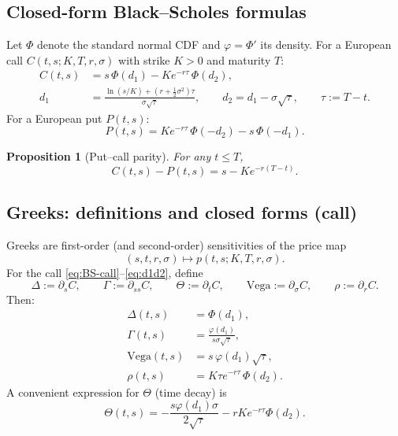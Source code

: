 \documentclass[11pt]{article}
\newcommand{\1}{\mathbf{1}}
\theoremstyle{plain}
\newtheorem{proposition}[theorem]{Proposition}
\theoremstyle{definition}
\theoremstyle{remark}
\begin{document}
\subsection{Closed-form Black--Scholes formulas}
Let $\Phi$ denote the standard normal CDF and $\varphi=\Phi'$ its density.
For a European call $C(t,s;K,T,r,\sigma)$ with strike $K>0$ and maturity $T$:
\begin{align}
C(t,s) &= s\,\Phi(d_1)-K e^{-r\tau}\,\Phi(d_2), \label{eq:BS-call}\\
d_1 &= \frac{\ln(s/K)+(r+\tfrac12\sigma^2)\tau}{\sigma\sqrt{\tau}},\qquad
d_2 = d_1-\sigma\sqrt{\tau},\qquad \tau:=T-t. \label{eq:d1d2}
\end{align}
For a European put $P(t,s)$:
\begin{equation}\label{eq:BS-put}
P(t,s)=K e^{-r\tau}\,\Phi(-d_2)-s\,\Phi(-d_1).
\end{equation}

\begin{proposition}[Put--call parity]
For any $t\le T$,
\begin{equation}\label{eq:put-call-parity}
C(t,s)-P(t,s)=s-K e^{-r(T-t)}.
\end{equation}
\end{proposition}

\subsection{Greeks: definitions and closed forms (call)}
Greeks are first-order (and second-order) sensitivities of the price map
\[
(s,t,r,\sigma)\longmapsto p(t,s;K,T,r,\sigma).
\]
For the call \eqref{eq:BS-call}--\eqref{eq:d1d2}, define
\[
\Delta:=\partial_s C,\qquad
\Gamma:=\partial_{ss}C,\qquad
\Theta:=\partial_t C,\qquad
\text{Vega}:=\partial_\sigma C,\qquad
\rho:=\partial_r C.
\]
Then:
\begin{align}
\Delta(t,s) &= \Phi(d_1), \label{eq:delta}\\
\Gamma(t,s) &= \frac{\varphi(d_1)}{s\sigma\sqrt{\tau}}, \label{eq:gamma}\\
\text{Vega}(t,s) &= s\,\varphi(d_1)\sqrt{\tau}, \label{eq:vega}\\
\rho(t,s) &= K\tau e^{-r\tau}\,\Phi(d_2). \label{eq:rho}
\end{align}
A convenient expression for $\Theta$ (time decay) is
\begin{equation}\label{eq:theta}
\Theta(t,s)=
-\frac{s\varphi(d_1)\sigma}{2\sqrt{\tau}}
-rK e^{-r\tau}\Phi(d_2).
\end{equation}
\end{document}
